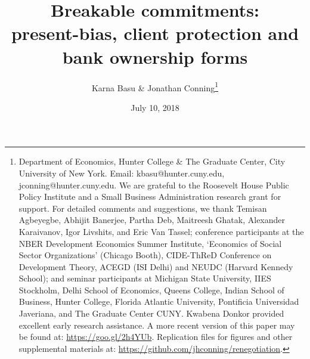 \documentclass[11pt,english]{article}
\date{July 10, 2018}\usepackage{babel}
\theoremstyle{plain}
\theoremstyle{definition}
\begin{document}
\title{Breakable commitments: \\
 present-bias, client protection and bank ownership forms}

\author{Karna Basu \& Jonathan Conning\thanks{Department of Economics, Hunter College \& The Graduate Center, City
University of New York. Email: kbasu@hunter.cuny.edu, jconning@hunter.cuny.edu.
We are grateful to the Roosevelt House Public Policy Institute and
a Small Business Administration research grant for support. For detailed
comments and suggestions, we thank Temisan Agbeyegbe, Abhijit Banerjee,
Partha Deb, Maitreesh Ghatak, Alexander Karaivanov, Igor Livshits,
and Eric Van Tassel; conference participants at the NBER Development
Economics Summer Institute, `Economics of Social Sector Organizations'
(Chicago Booth), CIDE-ThReD Conference on Development Theory, ACEGD
(ISI Delhi) and NEUDC (Harvard Kennedy School); and seminar participants
at Michigan State University, IIES Stockholm, Delhi School of Economics,
Queens College, Indian School of Business, Hunter College, Florida
Atlantic University, Pontificia Universidad Javeriana, and The Graduate
Center CUNY. Kwabena Donkor provided excellent early research assistance.
A more recent version of this paper may be found at: \protect\protect\protect\url{https://goo.gl/2h4YUb}.
Replication files for figures and other supplemental materials at:
\protect\protect\protect\url{https://github.com/jhconning/renegotiation}.}}
\maketitle
\end{document}

